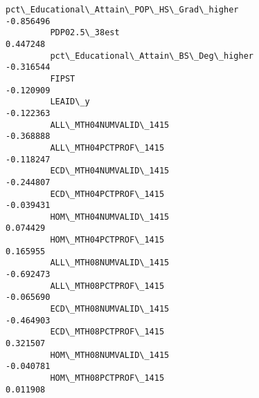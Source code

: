 \documentclass[11pt]{article}
\begin{document}
\begin{Verbatim}[commandchars=\\\{\}]
         pct\_Educational\_Attain\_POP\_HS\_Grad\_higher                    -0.856496   
         PDP02.5\_38est                                                 0.447248   
         pct\_Educational\_Attain\_BS\_Deg\_higher                         -0.316544   
         FIPST                                                        -0.120909   
         LEAID\_y                                                      -0.122363   
         ALL\_MTH04NUMVALID\_1415                                       -0.368888   
         ALL\_MTH04PCTPROF\_1415                                        -0.118247   
         ECD\_MTH04NUMVALID\_1415                                       -0.244807   
         ECD\_MTH04PCTPROF\_1415                                        -0.039431   
         HOM\_MTH04NUMVALID\_1415                                        0.074429   
         HOM\_MTH04PCTPROF\_1415                                         0.165955   
         ALL\_MTH08NUMVALID\_1415                                       -0.692473   
         ALL\_MTH08PCTPROF\_1415                                        -0.065690   
         ECD\_MTH08NUMVALID\_1415                                       -0.464903   
         ECD\_MTH08PCTPROF\_1415                                         0.321507   
         HOM\_MTH08NUMVALID\_1415                                       -0.040781   
         HOM\_MTH08PCTPROF\_1415                                         0.011908   
         

\end{Verbatim}
\end{document}
